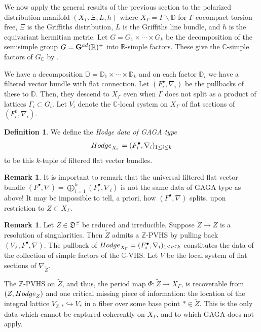 \documentclass[10pt,letterpaper,english,reqno]{amsart}
\numberwithin{equation}{subsection}
\newcommand\fD{{\mathfrak D}}
\newcommand\C{{\mathbb C}}
\newcommand\bD{{\mathbb D}}
\newcommand\R{{\mathbb R}}
\newcommand\Z{{\mathbb Z}}
\newcommand\wZ{{\widetilde Z}}
\newcommand\bfG{{\mathbf G}}
\theoremstyle{definition}
\newtheorem{definition}[theorem]{Definition}
\newtheorem{remark}[theorem]{Remark}
\begin{document}
We now apply the general results of the previous
section to the polarized
distribution manifold $(X_\Gamma, \Xi, L, h)$
where $X_\Gamma = \Gamma\backslash \bD$ for $\Gamma$
cocompact torsion free, $\Xi$ is the Griffiths
distribution, $L$ is the Griffiths line bundle, and $h$ is the 
equivariant hermitian metric. Let 
$G=G_1\times \cdots \times G_k$
be the decomposition of the semisimple group
$G=\bfG^{\rm ad}(\R)^+$ into $\R$-simple factors.
These give the $\C$-simple factors of $G_\C$
by \cite[4.4.10]{simpsons-ihes-local-systems}.

We have a decomposition
$\bD = \bD_1\times\cdots \times \bD_k$
and on each factor $\bD_i$ we have a filtered
vector bundle with flat connection. Let
$(F^\bullet_i,\nabla_i)$ be the pullbacks of these
to $\bD$. Then, they descend to $X_\Gamma$
even when $\Gamma$ does not split as a product
of lattices $\Gamma_i\subset G_i$.
Let $V_i$ denote the $\C$-local system on $X_\Gamma$
of flat sections of $(F^0_i,\nabla_i)$.

\begin{definition} We define the 
{\it Hodge data of GAGA type}
$${\rm Hodge}_{X_\Gamma} = (F^\bullet_i, \nabla_i)_{1\leq i \leq k}$$ 
to be this $k$-tuple of
filtered flat vector bundles.
\end{definition}

\begin{remark} It is important to remark that 
the universal filtered flat vector bundle
$(F^\bullet,\nabla) = \textstyle\bigoplus_{i=1}^k 
(F^\bullet_i,\nabla_i)$
is not the same data of GAGA type as above! 
It may be impossible  to tell, a priori,
how $(F^\bullet,\nabla)$ splits, 
upon restriction to $Z\subset X_\Gamma$.
\end{remark}

\begin{remark}\label{above}
Let $Z\in \fD^{\Xi}$ be reduced and irreducible. 
Suppose $\wZ\to Z$ is a resolution of
singularities. Then $\wZ$ admits a $\Z$-PVHS by pulling
back $(V_\Z, F^\bullet,\nabla)$.
The pullback of ${\rm Hodge}_{X_\Gamma}=(F^\bullet_i,\nabla_i)_{1\leq i\leq k}$
constitutes the data of the collection
of simple factors of the $\C$-VHS.
Let $V$ be the local system of flat sections of
$\nabla_{\wZ}$.

The $\Z$-PVHS on $\wZ$, and thus, the period
map $\Phi\colon \wZ\to X_\Gamma$, is recoverable
from $(Z,{\rm Hodge}_Z)$ and
one critical missing piece of information:
the location of the integral lattice 
$V_{\Z,*}\hookrightarrow V_*$ in a fiber over
some base point $*\in \wZ$. This is the only data
which cannot be captured coherently on
$X_\Gamma$, and to which GAGA does not apply.
\end{remark}
\end{document}
